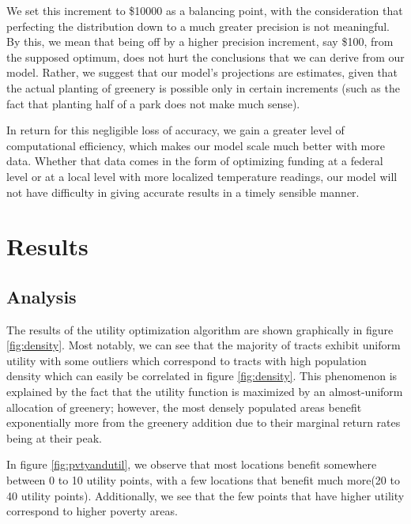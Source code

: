 \documentclass[11pt]{article}
\begin{document}
We set this increment to \$10000 as a balancing point, with the consideration that perfecting the distribution down to a much greater precision is not meaningful. By this, we mean that being off by a higher precision increment, say \$100, from the supposed optimum, does not hurt the conclusions that we can derive from our model. Rather, we suggest that our model's projections are estimates, given that the actual planting of greenery is possible only in certain increments (such as the fact that planting half of a park does not make much sense).

In return for this negligible loss of accuracy, we gain a greater level of computational efficiency, which makes our model scale much better with more data. Whether that data comes in the form of optimizing funding at a federal level or at a local level with more localized temperature readings, our model will not have difficulty in giving accurate results in a timely sensible manner.


\section{Results}
\subsection{Analysis}
The results of the utility optimization algorithm are shown graphically in figure \ref{fig:density}. Most notably, we can see that the majority of tracts exhibit uniform utility with some outliers which correspond to tracts with high population density which can easily be correlated in figure \ref{fig:density}. This phenomenon is explained by the fact that the utility function is maximized by an almost-uniform allocation of greenery; however, the most densely populated areas benefit exponentially more from the greenery addition due to their marginal return rates being at their peak.

In figure \ref{fig:pvtyandutil}, we observe that most locations benefit somewhere between 0 to 10 utility points, with a few locations that benefit much more(20 to 40 utility points). Additionally, we see that the few points that have higher utility correspond to higher poverty areas.
\end{document}
